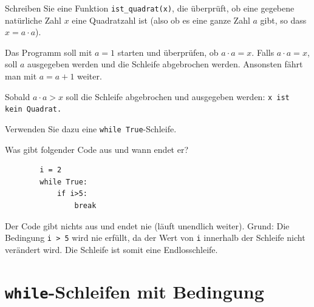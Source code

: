 \begin{myexercise}
	Schreiben Sie eine Funktion \lstinline|ist_quadrat(x)|, die überprüft, ob eine gegebene natürliche Zahl $x$ eine Quadratzahl ist (also ob es eine ganze Zahl $a$ gibt, so dass $x = a \cdot a$).

	Das Programm soll mit $a = 1$ starten und überprüfen, ob $a \cdot a = x$. Falls $a \cdot a = x$, soll $a$ ausgegeben werden und die Schleife abgebrochen werden. Ansonsten fährt man mit $a = a+1$ weiter.

	Sobald $a \cdot a > x$ soll die Schleife abgebrochen und ausgegeben werden: \texttt{x ist kein Quadrat.}

	Verwenden Sie dazu eine \lstinline|while True|-Schleife.

	\begin{myanswer}
		
	\end{myanswer}
\end{myexercise}

\begin{mychallenge}
	Was gibt folgender Code aus und wann endet er?
	\begin{lstlisting}
		i = 2
		while True:
			if i>5:
				break
	\end{lstlisting}

	\begin{myanswer}
		Der Code gibt nichts aus und endet nie (läuft unendlich weiter). Grund: Die Bedingung \lstinline|i > 5| wird nie erfüllt, da der Wert von \lstinline|i| innerhalb der Schleife nicht verändert wird. Die Schleife ist somit eine Endlosschleife.
	\end{myanswer}
\end{mychallenge}

\section{\texorpdfstring{\lstinline|while|}{while}-Schleifen mit Bedingung}

